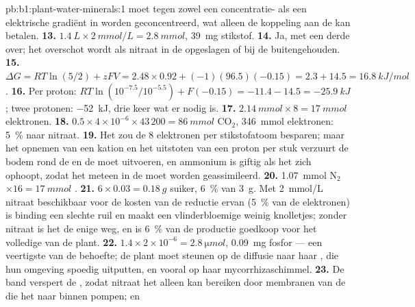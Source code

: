 \begin{solution}{pb:b1:plant-water-minerals:1}
moet tegen zowel een concentratie- als een elektrische gradiënt in worden
geconcentreerd, wat alleen de koppeling aan de  kan betalen.
\textbf{13.} $\qty{1.4}{L}\times\qty{2}{mmol/L} = \qty{2.8}{mmol}$,
\qty{39}{mg} stikstof.
\textbf{14.} Ja, met een derde over; het overschot wordt als nitraat in de
 opgeslagen of bij de  buitengehouden.
\textbf{15.} $\Delta G = RT\ln(5/2) + zFV = 2.48\times 0.92 + (-1)(96.5)(-0.15)
= 2.3 + 14.5 = \qty{16.8}{kJ/mol}$.
\textbf{16.} Per proton: $RT\ln(10^{-7.5}/10^{-5.5}) + F(-0.15) =
-11.4 - 14.5 = \qty{-25.9}{kJ}$; twee protonen: \qty{-52}{kJ}, drie keer
wat er nodig is.
\textbf{17.} $\qty{2.14}{mmol}\times 8 = \qty{17}{mmol}$ elektronen.
\textbf{18.} $0.5\times 4\times 10^{-6}\times 43\,200 = \qty{86}{mmol}$
$\mathrm{CO_2}$, \qty{346}{mmol} elektronen: \qty{5}{\%} naar
nitraat.
\textbf{19.} Het zou de 8 elektronen per stikstofatoom besparen; maar het
opnemen van een kation en het uitstoten van een proton per stuk verzuurt de
bodem rond de  en de  moet  uitvoeren, en ammonium is giftig
als het zich ophoopt, zodat het meteen in de  moet worden
geassimileerd.
\textbf{20.} \qty{1.07}{mmol} $\mathrm{N_2}$ $\times 16 =
\qty{17}{mmol}$ .
\textbf{21.} $6\times 0.03 = \qty{0.18}{g}$ suiker, \qty{6}{\%} van
\qty{3}{g}. Met \qty{2}{mmol/L} nitraat beschikbaar voor de kosten van de
reductie ervan (\qty{5}{\%} van de elektronen) is binding een slechte ruil
en maakt een vlinderbloemige weinig knolletjes; zonder nitraat is het de
enige weg, en is \qty{6}{\%} van de productie goedkoop voor het volledige
 van de plant.
\textbf{22.} $1.4\times 2\times 10^{-6} = \qty{2.8}{\micro mol}$,
\qty{0.09}{mg} fosfor --- een veertigste van de behoefte; de plant moet
steunen op de diffusie naar haar , die hun omgeving spoedig
uitputten, en vooral op haar mycorrhizaschimmel.
\textbf{23.} De band verspert de , zodat nitraat het  alleen
kan bereiken door membranen van de  die het naar binnen pompen; en

\end{solution}
